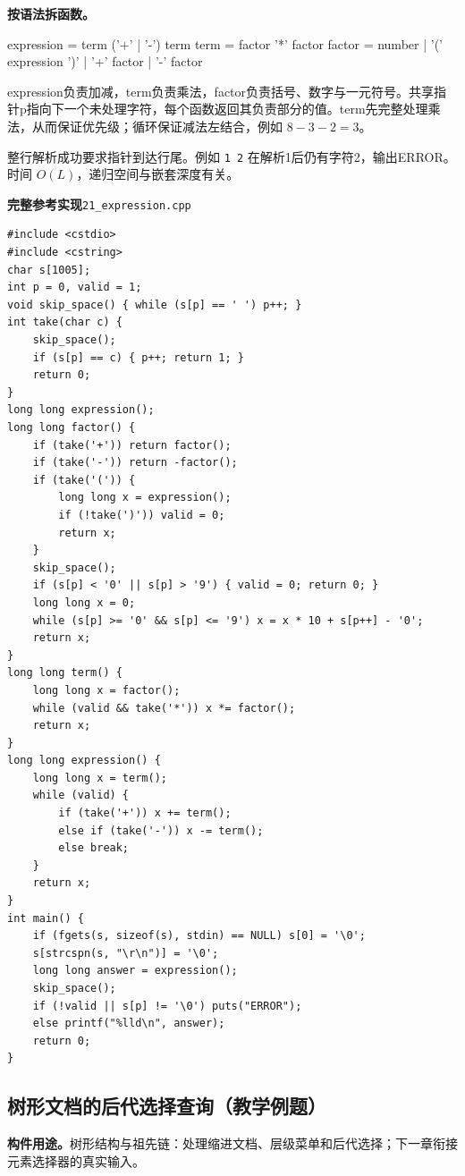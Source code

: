 \documentclass[UTF8,11pt,a4paper,fontset=none]{ctexart}
\begin{document}
\noindent\textbf{按语法拆函数。}
\begin{tcolorbox}[samplebox,title={语法规则}]
\begin{Sample}
expression = term { ('+' | '-') term }
term       = factor { '*' factor }
factor     = number | '(' expression ')' | '+' factor | '-' factor
\end{Sample}
\end{tcolorbox}
expression负责加减，term负责乘法，factor负责括号、数字与一元符号。共享指针p指向下一个未处理字符，每个函数返回其负责部分的值。term先完整处理乘法，从而保证优先级；循环保证减法左结合，例如 $8-3-2=3$。

整行解析成功要求指针到达行尾。例如 \texttt{1 2} 在解析1后仍有字符2，输出ERROR。时间 $O(L)$，递归空间与嵌套深度有关。
\par\noindent\begin{minipage}{\linewidth}
\textbf{完整参考实现}\quad\texttt{21\_expression.cpp}
\begin{lstlisting}
#include <cstdio>
#include <cstring>
char s[1005];
int p = 0, valid = 1;
void skip_space() { while (s[p] == ' ') p++; }
int take(char c) {
    skip_space();
    if (s[p] == c) { p++; return 1; }
    return 0;
}
long long expression();
long long factor() {
    if (take('+')) return factor();
    if (take('-')) return -factor();
    if (take('(')) {
        long long x = expression();
        if (!take(')')) valid = 0;
        return x;
    }
    skip_space();
    if (s[p] < '0' || s[p] > '9') { valid = 0; return 0; }
    long long x = 0;
    while (s[p] >= '0' && s[p] <= '9') x = x * 10 + s[p++] - '0';
    return x;
}
long long term() {
    long long x = factor();
    while (valid && take('*')) x *= factor();
    return x;
}
long long expression() {
    long long x = term();
    while (valid) {
        if (take('+')) x += term();
        else if (take('-')) x -= term();
        else break;
    }
    return x;
}
int main() {
    if (fgets(s, sizeof(s), stdin) == NULL) s[0] = '\0';
    s[strcspn(s, "\r\n")] = '\0';
    long long answer = expression();
    skip_space();
    if (!valid || s[p] != '\0') puts("ERROR");
    else printf("%lld\n", answer);
    return 0;
}
\end{lstlisting}
\end{minipage}\par


\subsection{树形文档的后代选择查询（教学例题）}
\noindent\textbf{构件用途。}树形结构与祖先链：处理缩进文档、层级菜单和后代选择；下一章衔接元素选择器的真实输入。
\end{document}
